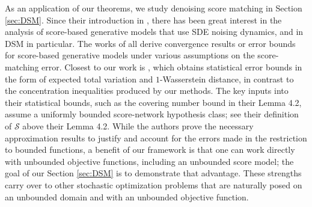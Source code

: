 As an  application of our theorems, we study denoising score matching  in Section \ref{sec:DSM}. Since their introduction in \cite{songscore}, there has been great interest in the analysis of score-based generative models that use SDE noising dynamics, and in  DSM in particular.   The works of 
\cite{chen2023improved,pedrotti2023improved,bentonnearly,li2024towards,li2024sharp,potaptchik2024linear,chen2024equivariant,mimikos2024score} all derive convergence results or error bounds for score-based generative models under various assumptions on the score-matching error.  Closest to our work is \cite{oko2023diffusion}, which  obtains statistical error bounds in the form of expected total variation and $1$-Wasserstein distance, in contrast to the concentration inequalities produced by our methods.  The key  inputs into their statistical bounds, such as the covering number bound in their Lemma 4.2, assume a uniformly bounded score-network hypothesis class; see their definition of $\mathcal{S}$ above their Lemma 4.2.  While the authors  prove the  necessary approximation results  to justify and account for the errors made in the restriction to bounded functions, a benefit of our framework is that one can work directly with  unbounded objective functions, including an unbounded score model; the goal of our   Section \ref{sec:DSM} is to demonstrate that advantage.  These strengths carry over to other stochastic optimization problems that are naturally posed on an unbounded domain and with an unbounded objective function.